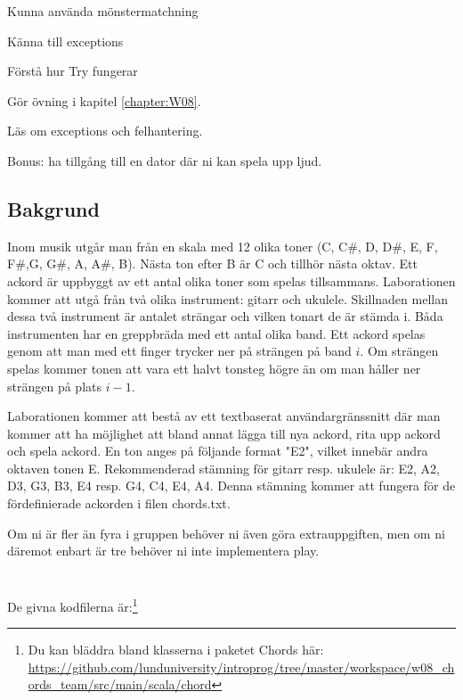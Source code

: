 

\Teamlab{\LabWeekEIGHT}

\begin{Goals}
\item Kunna använda mönstermatchning
\item Känna till exceptions
\item Förstå hur Try fungerar

\end{Goals}

\begin{Preparations}
\item Gör övning {\tt \ExeWeekEIGHT} i kapitel \ref{chapter:W08}.
\item Läs om exceptions och felhantering.
\item Bonus: ha tillgång till en dator där ni kan spela upp ljud.

\end{Preparations}

\subsection{Bakgrund}
Inom musik utgår man från en skala med 12 olika toner (C, C\#, D, D\#, E, F, F\#,G, G\#, A, A\#, B). Nästa ton efter B är C och tillhör nästa oktav. Ett ackord är uppbyggt av ett antal olika toner som spelas tillsammans. Laborationen kommer att utgå från två olika instrument: gitarr och ukulele. Skillnaden mellan dessa två instrument är antalet strängar och vilken tonart de är stämda i. Båda instrumenten har en greppbräda med ett antal olika band. Ett ackord spelas genom att man med ett finger trycker ner på strängen på band $i$. Om strängen spelas kommer tonen att vara ett halvt tonsteg högre än om man håller ner strängen på plats $i-1$.

Laborationen kommer att bestå av ett textbaserat användargränssnitt där man kommer att ha möjlighet att bland annat lägga till nya ackord, rita upp ackord och spela ackord. En ton anges på följande format "E2", vilket innebär andra oktaven tonen E. Rekommenderad stämning för gitarr resp. ukulele är: E2, A2, D3, G3, B3, E4 resp. G4, C4, E4, A4. Denna stämning kommer att fungera för de fördefinierade ackorden i filen chords.txt.

Om ni är fler än fyra i gruppen behöver ni även göra extrauppgiften, men om ni däremot enbart är tre behöver ni inte implementera play.
\\ \\ \\
De givna kodfilerna är:\footnote{Du kan bläddra bland klasserna i paketet Chords här: \\
\href{https://github.com/lunduniversity/introprog/tree/master/workspace/w08_chords_team/src/main/scala/chord}{\mbox{\fontsize{9}{11}\selectfont  https://github.com/lunduniversity/introprog/tree/master/workspace/w08\_chords\_team/src/main/scala/chord}}}

